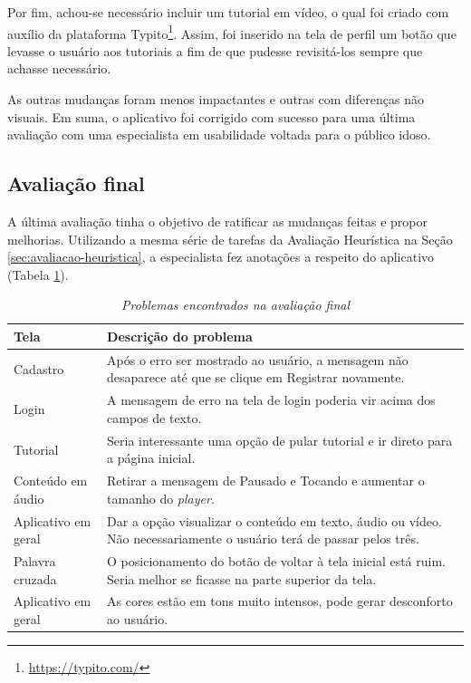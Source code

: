 
Por fim, achou-se necessário incluir um tutorial em vídeo, o qual foi criado com auxílio da plataforma Typito\footnote{\url{https://typito.com/}}. Assim, foi inserido na tela de perfil um botão que levasse o usuário aos tutoriais a fim de que pudesse revisitá-los sempre que achasse necessário.

As outras mudanças foram menos impactantes e outras com diferenças não visuais. Em suma, o aplicativo foi corrigido com sucesso para uma última avaliação com uma especialista em usabilidade voltada para o público idoso.

\subsection{Avaliação final}
A última avaliação tinha o objetivo de ratificar as mudanças feitas e propor melhorias. Utilizando a mesma série de tarefas da Avaliação Heurística na Seção \ref{sec:avaliacao-heuristica}, a especialista fez anotações a respeito do aplicativo (Tabela \ref{tab:avaliacao_final}).

\begin{table}[H]
\centering
\caption{\textit{Problemas encontrados na avaliação final}}
\centering
\footnotesize
\begin{tabular}{p{4cm} p{12cm}}
\toprule
 \textbf{Tela} & \textbf{Descrição do problema}       
\\ \midrule
Cadastro
&
Após o erro ser mostrado ao usuário, a mensagem não desaparece até que se clique em Registrar novamente.
\\ \midrule
Login
&
A mensagem de erro na tela de login poderia vir acima dos campos de texto.
\\ \midrule
Tutorial
&
Seria interessante uma opção de pular tutorial e ir direto para a página inicial.
\\ \midrule
Conteúdo em áudio
&
Retirar a mensagem de Pausado e Tocando e aumentar o tamanho do \textit{player}.
\\ \midrule
Aplicativo em geral
&
Dar a opção visualizar o conteúdo em texto, áudio ou vídeo. Não necessariamente o usuário terá de passar pelos três.
\\ \midrule
Palavra cruzada
&
O posicionamento do botão de voltar à tela inicial está ruim. Seria melhor se ficasse na parte superior da tela.
\\ \midrule
Aplicativo em geral
&
As cores estão em tons muito intensos, pode gerar desconforto ao usuário.
\\ \bottomrule

\end{tabular}
\label{tab:avaliacao_final}
\end{table}

